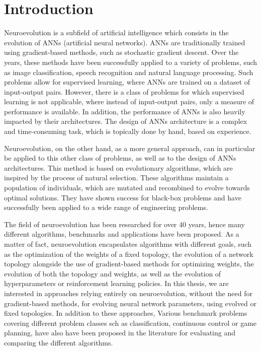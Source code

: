 \chapter{Introduction}

Neuroevolution is a subfield of artificial intelligence which consists in the evolution of ANNs (artificial neural networks).
ANNs are traditionally trained using gradient-based methods, such as stochastic gradient descent.
Over the years, these methods have been successfully applied to a variety of problems, such as image classification, speech recognition and natural language processing.
Such problems allow for supervised learning, where ANNs are trained on a dataset of input-output pairs.
However, there is a class of problems for which supervised learning is not applicable, where instead of input-output pairs, only a measure of performance is available.
In addition, the performance of ANNs is also heavily impacted by their architectures. The design of ANNs architecture is a complex and time-consuming task, which is
topically done by hand, based on experience.

Neuroevolution, on the other hand, as a more general approach, can in particular be applied to this other class of problems, as well as to the design of ANNs architectures.
This method is based on evolutionary algorithms, which are inspired by the process of natural selection. These algorithms maintain a population of individuals,
which are mutated and recombined to evolve towards optimal solutions. They have shown success for black-box problems and have successfully been applied to a wide range
of engineering problems.

The field of neuroevolution has been researched for over 40 years, hence many different algorithms, benchmarks and applications have been proposed.
As a matter of fact, neuroevolution encapsulates algorithms with different goals, such as the optimization of the weights of a fixed topology, the evolution of a
network topology alongside the use of gradient-based methods for optimizing weights, the evolution of both the topology and weights, as well as the evolution
of hyperparameters or reinforcement learning policies.
In this thesis, we are interested in approaches relying entirely on neuroevolution, without the need for gradient-based methods, for evolving neural network
parameters, using evolved or fixed topologies. In addition to these approaches, Various benchmark problems covering different problem classes sch as classification,
continuous control or game planning, have also have been proposed in the literature for evaluating and comparing the different algorithms.

